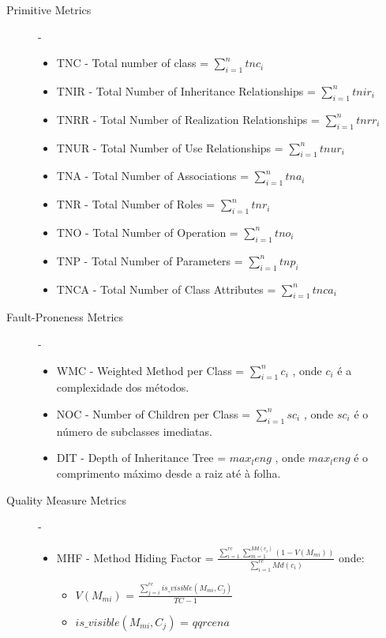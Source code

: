 \begin{description}
 \item [Primitive Metrics] - \begin{itemize}
				\item TNC - Total number of class  = $ \sum_{i=1}^{n} tnc_i $
				\item TNIR - Total Number of Inheritance Relationships  = $ \sum_{i=1}^{n} tnir_i $
				\item TNRR - Total Number of Realization Relationships  = $ \sum_{i=1}^{n} tnrr_i $
				\item TNUR - Total Number of Use Relationships  = $ \sum_{i=1}^{n} tnur_i $
				\item TNA - Total Number of Associations  = $ \sum_{i=1}^{n} tna_i $
				\item TNR - Total Number of Roles  = $ \sum_{i=1}^{n} tnr_i $
				\item TNO - Total Number of Operation  = $ \sum_{i=1}^{n} tno_i $
				\item TNP - Total Number of Parameters  = $ \sum_{i=1}^{n} tnp_i $
				\item TNCA - Total Number of Class Attributes  = $ \sum_{i=1}^{n} tnca_i $
			    \end{itemize}
 \item [Fault-Proneness Metrics] - \begin{itemize}
                                   \item WMC - Weighted Method per Class  = $ \sum_{i=1}^{n} c_i $ , onde $c_i$ é a complexidade dos métodos.
				   \item NOC - Number of Children per Class = $ \sum_{i=1}^{n} sc_i $ , onde $sc_i$ é o número de subclasses imediatas.
				   \item DIT - Depth of Inheritance Tree  = $ max_leng $ , onde $ max_leng $ é o comprimento máximo desde a raiz até à folha.
                                  \end{itemize}
 \item [Quality Measure Metrics] - \begin{itemize}
                                   \item MHF - Method Hiding Factor = $ \frac{\sum_{i=1}^{rc} \sum_{m=1}^{Md(c_i)} (1-V(M_{mi}))} {\sum_{i=1}^{rc} Md(c_i)} $ onde: \begin{itemize}
																				      \item $V(M_{mi})$ = $\frac{\sum_{j=i}^{rc} is\_visible(M_{mi},C_j)}{TC-1} $
																				      \item $is\_visible(M_{mi},C_j) $ = $ qqrcena $
																				    \end{itemize}

                                  \end{itemize}


  
\end{description}